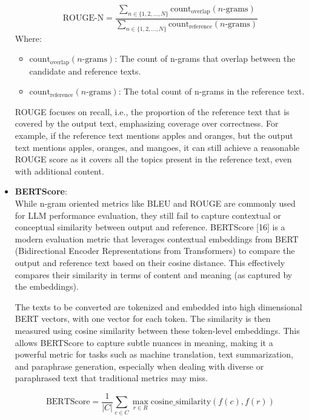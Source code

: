 \documentclass[12pt]{article}
\begin{document}
\begin{itemize}
        \[
            \text{ROUGE-N} = \frac{\sum_{n \in \{1, 2, \dots, N\}} \text{count}_{\text{overlap}}(n\text{-grams})}{\sum_{n \in \{1, 2, \dots, N\}} \text{count}_{\text{reference}}(n\text{-grams})}
        \]
        Where:
        \begin{itemize}
            \item \(\text{count}_{\text{overlap}}(n\text{-grams})\): The count of n-grams that overlap between the candidate and reference texts.
            \item \(\text{count}_{\text{reference}}(n\text{-grams})\): The total count of n-grams in the reference text.
        \end{itemize}

        ROUGE focuses on recall, i.e., the proportion of the reference text that is covered by the output text, emphasizing coverage over correctness. For example, if the reference text mentions apples and oranges, but the output text mentions apples, oranges, and mangoes, it can still achieve a reasonable ROUGE score as it covers all the topics present in the reference text, even with additional content.


        \item \textbf{BERTScore}: \\
        While n-gram oriented metrics like BLEU and ROUGE are commonly used for LLM performance evaluation, they still fail to capture contextual or conceptual similarity between output and reference.
        BERTScore [16] is a modern evaluation metric that leverages contextual embeddings from BERT (Bidirectional Encoder Representations from Transformers) to compare the output and reference text based on their cosine distance. This effectively compares their similarity in terms of content and meaning (as captured by the embeddings).

        The texts to be converted are tokenized and embedded into high dimensional BERT vectors, with one vector for each token. The similarity is then measured using cosine similarity between these token-level embeddings. This allows BERTScore to capture subtle nuances in meaning, making it a powerful metric for tasks such as machine translation, text summarization, and paraphrase generation, especially when dealing with diverse or paraphrased text that traditional metrics may miss.

        \[
            \text{BERTScore} = \frac{1}{|C|} \sum_{c \in C} \max_{r \in R} \text{cosine\_similarity}(f(c), f(r))
        \]


\end{itemize}
\end{document}
